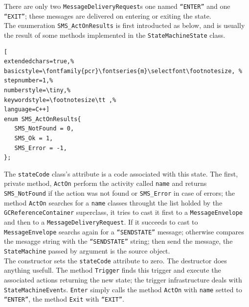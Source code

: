 There are only two \texttt{MessageDeliveryRequest}s one named \texttt{``ENTER''} and one \texttt{``EXIT''}; these messages are delivered on entering or exiting the state. \\


The enumeration \texttt{SMS\_ActOnResults} is first introducted as below, and is usually the result of some methods implemented in the \texttt{StateMachineState} class.
\begin{lstlisting}[
extendedchars=true,%
basicstyle=\fontfamily{pcr}\fontseries{m}\selectfont\footnotesize, %
stepnumber=1,%
numberstyle=\tiny,%
keywordstyle=\footnotesize\tt ,%
language=C++]
enum SMS_ActOnResults{
   SMS_NotFound = 0,
   SMS_Ok = 1,
   SMS_Error = -1,
};
\end{lstlisting}

The \texttt{stateCode} class's attribute is a code associated with this state. The first, private method, \texttt{ActOn} perform the activity called \texttt{name} and returns \texttt{SMS\_NotFound} if the action was not found or \texttt{SMS\_Error} in case of errors; the method \texttt{ActOn} searches for a \texttt{name} classes throught the list holded by the \texttt{GCReferenceContainer} superclass, it tries to cast it first to a \texttt{MessageEnvelope} and then to a \texttt{MessageDeliveryRequest}. If it succeeds to cast to \texttt{MessageEnvelope} searchs again for a \texttt{``SENDSTATE''} message; otherwise compares the mesagge string with the \texttt{``SENDSTATE''} string; then send the message, the \texttt{StateMachine} passed by argument is the source object.\\


The constructor sets the \texttt{stateCode} attribute to zero. The destructor does anything usefull. The method \texttt{Trigger} finds this trigger and execute the associated actions returning the new state; the trigger infrastructure deals with \texttt{StateMachineEvent}s. \texttt{Enter} simply calls the method \texttt{ActOn} with \texttt{name} setted to \texttt{``ENTER''}, the method \texttt{Exit} with \texttt{``EXIT''}.\\


